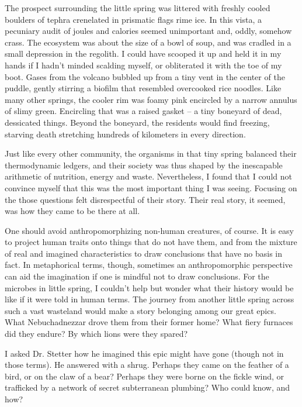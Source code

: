 The prospect surrounding the little spring was littered with freshly cooled boulders of tephra crenelated in prismatic flags rime ice. In this vista, a pecuniary audit of joules and calories seemed unimportant and, oddly, somehow crass. The ecosystem was about the size of a bowl of soup, and was cradled in a small depression in the regolith. I could have scooped it up and held it in my hands if I hadn't minded scalding myself, or obliterated it with the toe of my boot. Gases from the volcano bubbled up from a tiny vent in the center of the puddle, gently stirring a biofilm that resembled overcooked rice noodles. Like many other springs, the cooler rim was foamy pink encircled by a narrow annulus of slimy green. Encircling that was a raised gasket -- a tiny boneyard of dead, dessicated things. Beyond the boneyard, the residents would find freezing, starving death stretching hundreds of kilometers in every direction. 

Just like every other community, the organisms in that tiny spring balanced their thermodynamic ledgers, and their society was thus shaped by the inescapable arithmetic of nutrition, energy and waste. Nevertheless, I found that I could not convince myself that this was the most important thing I was seeing. Focusing on the those questions felt disrespectful of their story. Their real story, it seemed, was how they came to be there at all.

One should avoid anthropomorphizing non-human creatures, of course. It is easy to project human traits onto things that do not have them, and from the mixture of real and imagined characteristics to draw conclusions that have no basis in fact. In metaphorical terms, though, sometimes an anthropomorphic perspective can aid the imagination if one is mindful not to draw conclusions. For the microbes in little spring, I couldn't help but wonder what their history would be like if it were told in human terms. The journey from another little spring across such a vast wasteland would make a story belonging among our great epics. What Nebuchadnezzar drove them from their former home? What fiery furnaces did they endure? By which lions were they spared?

I asked Dr. Stetter how he imagined this epic might have gone (though not in those terms). He answered with a shrug. Perhaps they came on the feather of a bird, or on the claw of a bear? Perhaps they were borne on the fickle wind, or trafficked by a network of secret subterranean plumbing? Who could know, and how?

